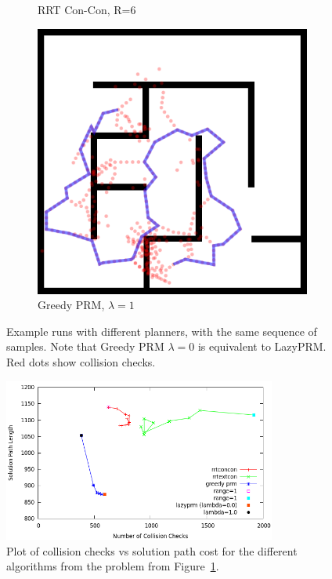 \documentclass{report}
\begin{document}
\begin{figure}
\begin{subfigure}[b]{0.3\textwidth}
\caption{RRT Con-Con, R=6}
\end{subfigure}%
\quad
\begin{subfigure}[b]{0.3\textwidth}
\includegraphics[width=\textwidth]{figs/compare-2d-rrtc1-checkmask-l10-s1.png}
\caption{Greedy PRM, $\lambda=1$}
\end{subfigure}%
\caption{Example runs with different planners,
   with the same sequence of samples.
   Note that Greedy PRM $\lambda=0$ is equivalent to LazyPRM.
   Red dots show collision checks.}
\label{fig:compare-2d-rrtc1-vis}
\end{figure}

\begin{figure}
\centering
\includegraphics[width=0.8\textwidth]{figs/compare-2d-rrtc1-medians.png}
\caption{Plot of collision checks vs solution path cost for the
   different algorithms from the problem from
   Figure~\ref{fig:compare-2d-rrtc1-vis}.}
\end{figure}
\end{document}
